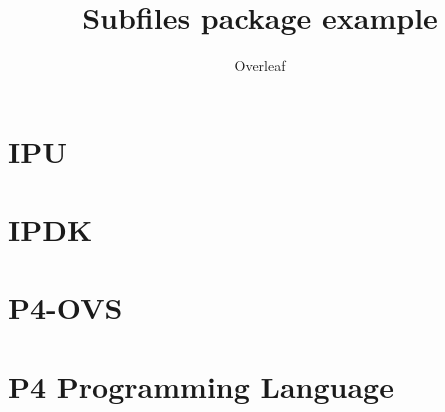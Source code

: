 \documentclass{article}
\title{Subfiles package example}
\author{Overleaf}
\date{ }
\begin{document}
\maketitle

\section{IPU}


\section{IPDK}


\section{P4-OVS}


\section{P4 Programming Language}

\end{document}
